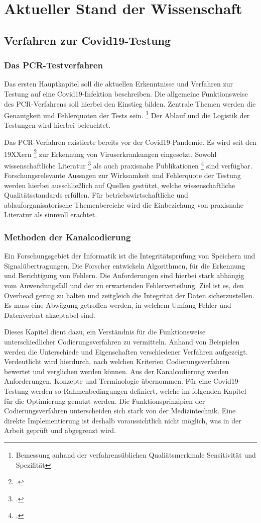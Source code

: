 
\chapter{Aktueller Stand der Wissenschaft}
\section{Verfahren zur Covid19-Testung}
\subsection{Das PCR-Testverfahren}
Das ersten Hauptkapitel soll die aktuellen Erkenntnisse und Verfahren zur Testung auf eine Covid19-Infektion beschreiben.
Die allgemeine Funktionsweise des PCR-Verfahrens soll hierbei den Einstieg bilden.
Zentrale Themen werden die Genauigkeit und Fehlerquoten der Tests sein.
\footnote{Bemessung anhand der verfahrensüblichen Qualiätsmerkmale Sensitivität und Spezifität}
Der Ablauf und die Logistik der Testungen wird hierbei beleuchtet.

Das PCR-Verfahren existierte bereits vor der Covid19-Pandemie.
Es wird seit den 19XXern
\footcite{Quelle erster Masseneinsatz PCR}
zur Erkennung von Viruserkrankungen eingesetzt.
Sowohl wissenschaftliche Literatur
\footcite{Wissenschaftlich PCR}
als auch praxisnahe Publikationen
\footcite{Praxishandbuch PCR}
sind verfügbar.
Forschungsrelevante Aussagen zur Wirksamkeit und Fehlerquote der Testung werden hierbei ausschließlich auf Quellen gestützt, welche wissenschaftliche Qualitätsstandards erfüllen.
Für betriebswirtschaftliche und ablauforganisatorische Themenbereiche wird die Einbeziehung von praxisnahe Literatur als sinnvoll erachtet.

\subsection{Methoden der Kanalcodierung}
Ein Forschungsgebiet der Informatik ist die Integritätsprüfung von Speichern und Signalübertragungen.
Die Forscher entwickeln Algorithmen, für die Erkennung und Berichtigung von Fehlern.
Die Anforderungen sind hierbei stark abhängig vom Anwendungsfall und der zu erwartenden Fehlerverteilung.
Ziel ist es, den Overhead gering zu halten und zeitgleich die Integrität der Daten sicherzustellen.
Es muss eine Abwägung getroffen werden, in welchem Umfang Fehler und Datenverlust akzeptabel sind.

Dieses Kapitel dient dazu, ein Verständnis für die Funktionsweise unterschiedlicher Codierungsverfahren zu vermitteln.
Anhand von Beispielen werden die Unterschiede und Eigenschaften verschiedener Verfahren aufgezeigt.
Verdeutlicht wird hierdurch, nach welchen Kriterien Codierungsverfahren bewertet und verglichen werden können.
Aus der Kanalcodierung werden Anforderungen, Konzepte und Terminologie übernommen.
Für eine Covid19-Testung werden so Rahmenbedingungen definiert, welche im folgenden Kapitel für die Optimierung genutzt werden.
Die Funktionsprinzipien der Codierungsverfahren unterscheiden sich stark von der Medizintechnik.
Eine direkte Implementierung ist deshalb voraussichtlich nicht möglich, was in der Arbeit geprüft und abgegrenzt wird.

